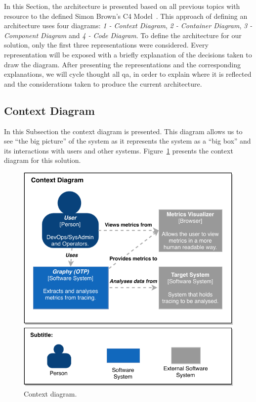 In this Section, the architecture is presented based on all previous topics with resource to the defined Simon Brown’s C4 Model~\cite{simon_browns_c4_model}. This approach of defining an architecture uses four diagrams: \emph{1 - Context Diagram}, \emph{2 - Container Diagram}, \emph{3 - Component Diagram} and \emph{4 - Code Diagram}. To define the architecture for our solution, only the first three representations were considered. Every representation will be exposed with a briefly explanation of the decisions taken to draw the diagram. After presenting the representations and the corresponding explanations, we will cycle thought all \gls{qa}, in order to explain where it is reflected and the considerations taken to produce the current architecture.

\subsection{Context Diagram}
\label{subsec:context_diagram}

In this Subsection the context diagram is presented. This diagram allows us to see ``the big picture'' of the system as it represents the system as a ``big box'' and its interactions with users and other systems. Figure~\ref{fig:context_diagram} presents the context diagram for this solution.

\begin{figure}[H]
    \centering
    \includegraphics[width=1.0\textwidth]{images/context_diagram.pdf}
    \caption{Context diagram.}
    \label{fig:context_diagram}
\end{figure}

